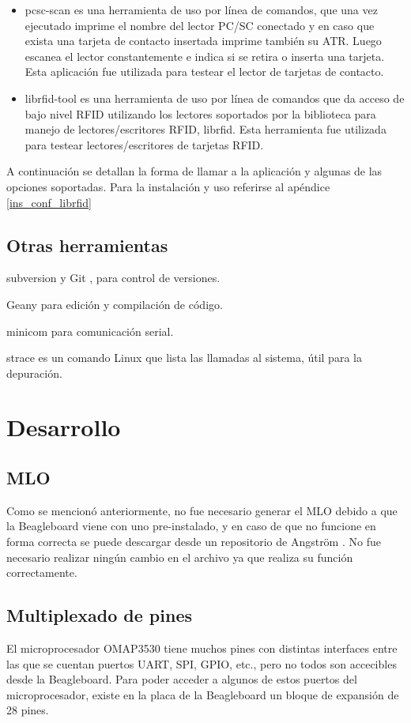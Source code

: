 \begin{itemize}
\item pcsc-scan es una herramienta de uso por línea de comandos, que una vez ejecutado imprime el nombre del lector PC/SC conectado y en caso que exista una tarjeta de contacto insertada imprime también su ATR. Luego  escanea el lector constantemente e indica si se retira o inserta una tarjeta. Esta aplicación fue utilizada para testear el lector de tarjetas de contacto.
\item  librfid-tool es una herramienta de uso por línea de comandos que da acceso de bajo nivel RFID utilizando los lectores soportados por la biblioteca para manejo de lectores/escritores RFID, librfid. Esta herramienta fue utilizada para testear lectores/escritores de tarjetas RFID.
\end{itemize}

A continuación se detallan la forma de llamar a la aplicación y algunas de las opciones soportadas. Para la instalación y uso referirse al apéndice \ref{ins_conf_librfid}

\subsection{Otras herramientas}
subversion \cite{subversion} y Git \cite{git}, para control de versiones. 

Geany \cite{geany} para edición y compilación de código.

minicom \cite{minicom} para comunicación serial.

strace es un comando Linux que lista las llamadas al sistema, útil para la depuración.

\section{Desarrollo}

\subsection{MLO}
Como se mencionó anteriormente, no fue necesario generar el MLO debido a que la Beagleboard viene con uno pre-instalado, y en caso de que no funcione en forma correcta se puede descargar desde un repositorio de Angström \cite{Angs_MLO}. No fue necesario realizar ningún cambio en el archivo ya que realiza su función correctamente.

\subsection{Multiplexado de pines}
El microprocesador OMAP3530 tiene muchos pines con distintas interfaces entre las
que se cuentan puertos UART, SPI, GPIO, etc., pero no todos son accecibles desde la Beagleboard. 
Para poder acceder a algunos de estos puertos del microprocesador, existe en la placa de la
Beagleboard un bloque de expansión de 28 pines.

